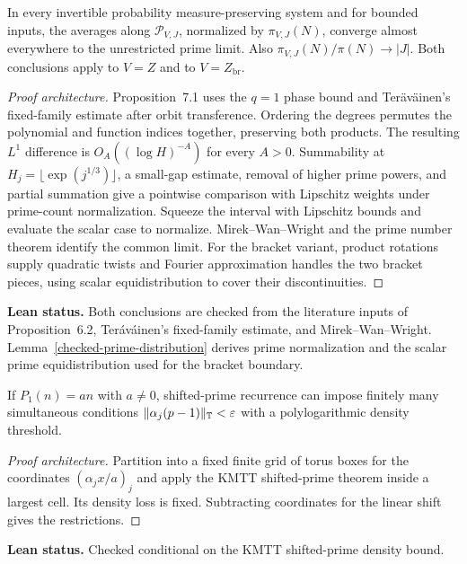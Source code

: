 \begin{theorem}\label{t:pointwise}
\leanok
{}
In every invertible probability measure-preserving system and for
bounded inputs, the averages along $\mathcal P_{V,J}$, normalized by
$\pi_{V,J}(N)$, converge almost everywhere to the unrestricted prime
limit. Also $\pi_{V,J}(N)/\pi(N)\to |J|$. Both conclusions apply
to $V=Z$ and to $V=Z_{\mathrm{br}}$.
\end{theorem}
\begin{proof}[Proof architecture]
\leanok
Proposition~7.1 uses the $q=1$ phase bound and Ter\"av\"ainen's
fixed-family estimate after orbit transference. Ordering the degrees
permutes the polynomial and function indices together, preserving
both products. The resulting
$L^1$ difference is $O_A((\log H)^{-A})$ for every $A>0$.
Summability at $H_j=\lfloor\exp(j^{1/3})\rfloor$, a small-gap
estimate, removal of higher prime powers, and partial summation
give a pointwise comparison with Lipschitz weights under prime-count
normalization. Squeeze the interval with Lipschitz bounds and evaluate
the scalar case to normalize. Mirek--Wan--Wright and the prime number
theorem identify the common limit. For the bracket variant, product
rotations supply quadratic twists and Fourier approximation handles
the two bracket pieces, using scalar equidistribution to cover their
discontinuities.
\end{proof}
\noindent\textbf{Lean status.} Both conclusions are checked from
the literature inputs of Proposition~6.2, Ter\'av\'ainen's fixed-family
estimate, and Mirek--Wan--Wright. Lemma~\ref{checked-prime-distribution}
derives prime normalization and the scalar prime equidistribution
used for the bracket boundary.

\begin{corollary}\label{c:bohr}
\leanok
If $P_1(n)=an$ with $a\ne0$, shifted-prime recurrence can impose
finitely many simultaneous conditions $\lVert\alpha_j(p-1)\rVert_{\mathbb T}<\varepsilon$
with a polylogarithmic density threshold.
\end{corollary}
\begin{proof}[Proof architecture]
\leanok
Partition into a fixed finite grid of torus boxes for
the coordinates $(\alpha_jx/a)_j$ and apply the KMTT shifted-prime
theorem inside a largest cell. Its density loss is fixed.
Subtracting coordinates for the linear shift gives the restrictions.
\end{proof}
\noindent\textbf{Lean status.} Checked conditional on the KMTT
shifted-prime density bound.


